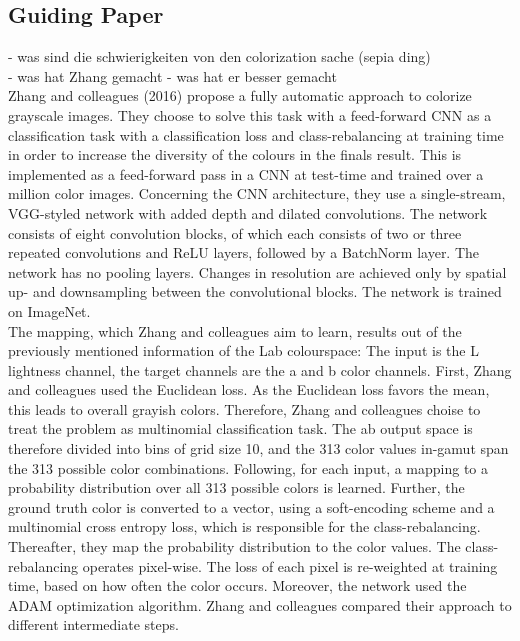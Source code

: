 \documentclass[12pt,letterpaper]{article}
\begin{document}
\subsection{Guiding Paper}
- was sind die schwierigkeiten von den colorization sache (sepia ding)\\
- was hat Zhang gemacht - was hat er besser gemacht\\
Zhang and colleagues (2016) propose a fully automatic approach to colorize grayscale images. They choose
to solve this task with a feed-forward CNN as a classification task with a classification loss and class-rebalancing at training time in order to increase the
diversity of the colours in the finals result. This is implemented as a feed-forward pass in a CNN at test-time and trained over a million color images. Concerning the
CNN architecture, they use a single-stream, VGG-styled network with added depth and dilated convolutions. The network consists of eight convolution blocks, of which each consists
of two or three repeated convolutions and ReLU layers, followed by a BatchNorm layer. The network has no pooling layers. Changes in resolution are achieved only by spatial up- and
downsampling between the convolutional blocks. The network is trained on ImageNet.\\
The mapping, which Zhang and colleagues aim to learn, results out of the previously mentioned information of the Lab colourspace: The input is the L lightness channel, the target channels
are the a and b color channels. First, Zhang and colleagues used the Euclidean loss. As the Euclidean loss favors the mean, this leads to overall grayish colors.
Therefore, Zhang and colleagues choise to treat the problem as multinomial classification task. The ab output space is therefore divided into bins of grid size 10, and the 313 color values in-gamut
span the 313 possible color combinations. Following, for each input, a mapping to a probability distribution over all 313 possible colors is learned.  Further, the ground truth color
is converted to a vector, using a soft-encoding scheme and a multinomial cross entropy loss, which is responsible for the class-rebalancing. Thereafter, they map the probability
distribution to the color values. The class-rebalancing operates pixel-wise. The loss of each pixel is re-weighted at training time, based on how often the color occurs. Moreover, the network
used the ADAM optimization algorithm. Zhang and colleagues compared their approach to different intermediate steps.
\end{document}

